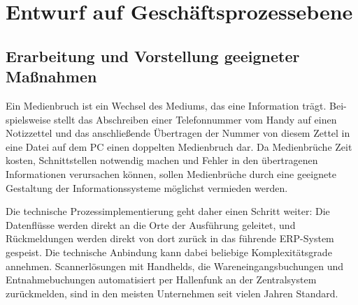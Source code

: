\section{Entwurf auf Geschäftsprozessebene}\label{sec:modellierung}






\subsection{Erarbeitung und Vorstellung geeigneter Maßnahmen}

Ein Medienbruch ist ein Wechsel des Mediums, das eine Information trägt. Bei- spielsweise stellt das Abschreiben einer Telefonnummer vom Handy auf einen Notizzettel und das anschließende Übertragen der Nummer von diesem Zettel in eine Datei auf dem PC einen doppelten Medienbruch dar. Da Medienbrüche Zeit kosten, Schnittstellen notwendig machen und Fehler in den übertragenen Informationen verursachen können, sollen Medienbrüche durch eine geeignete Gestaltung der Informationssysteme möglichst vermieden werden.

Die technische Prozessimplementierung geht daher einen Schritt weiter: Die Datenflüsse werden direkt an die Orte der Ausführung geleitet, und Rückmeldungen werden direkt von dort zurück in das führende ERP-System gespeist. Die technische Anbindung kann dabei beliebige Komplexitätsgrade annehmen. Scannerlösungen mit Handhelds, die Wareneingangsbuchungen und Entnahmebuchungen automatisiert per Hallenfunk an der Zentralsystem zurückmelden, sind in den meisten Unternehmen seit vielen Jahren Standard.




